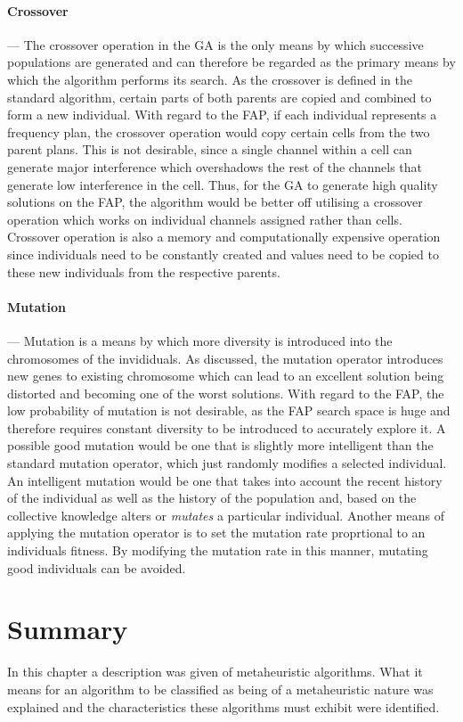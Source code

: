 \paragraph{Crossover}
--- The crossover operation in the GA is the only means by which successive populations are generated and can therefore be regarded as the primary means by which the algorithm performs its search. As the crossover is defined in the standard algorithm, certain parts of both parents are copied and combined to form a new individual. With regard to the FAP, if each individual represents a frequency plan, the crossover operation would copy certain cells from the two parent plans. This is not desirable, since a single channel within a cell can generate major interference which overshadows the rest of the channels that generate low interference in the cell. Thus, for the GA to generate high quality solutions on the FAP, the algorithm would be better off utilising a crossover operation which works on individual channels assigned rather than cells. Crossover operation is also a memory and computationally expensive operation since individuals need to be constantly created and values need to be copied to these new individuals from the respective parents.
\paragraph{Mutation}
--- Mutation is a means by which more diversity is introduced into the chromosomes of the invididuals.  As discussed, the mutation operator introduces new genes to existing chromosome which can lead to an excellent solution being distorted and becoming one of the worst solutions. With regard to the FAP, the low probability of mutation is not desirable, as the FAP search space is huge and therefore requires constant diversity to be introduced to accurately explore it. A possible good mutation would be one that is slightly more intelligent than the standard mutation operator, which just randomly modifies a selected individual. An intelligent mutation would be one that takes into account the recent history of the individual as well as the history of the population and, based on the collective knowledge alters or \emph{mutates} a particular individual. Another means of applying the mutation operator is to set the mutation rate proprtional to an individuals fitness. By modifying the mutation rate in this manner, mutating good individuals can be avoided.
\section {Summary}
In this chapter a description was given of metaheuristic algorithms. What it means for an algorithm to be classified as being of a metaheuristic nature was explained and the characteristics these algorithms must exhibit were identified.


